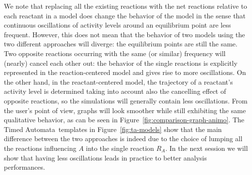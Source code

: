 \documentclass{llncs}
\newcommand{\tas}{Timed Automata}
\begin{document}
We note that replacing all the existing reactions with the net reactions relative to each
reactant in a model does change the behavior of the model in the sense that continuous oscillations
of activity levels around an equilibrium point are less frequent. However, this does not mean that the
behavior of two models using the two different approaches will diverge: the equilibrium points
are still the same.
Two opposite reactions occurring with the same (or similar) frequency will (nearly) cancel each other out: the
behavior of the single reactions is explicitly represented in the reaction-centered model and gives rise to more oscillations.
On the other hand, in the reactant-centered model, the trajectory of a reactant's activity level
is determined taking into account also the cancelling effect of opposite reactions, so the simulations
will generally contain less oscillations.
From the user's point of view, graphs will look smoother while still exhibiting the same qualitative behavior,
as can be seen in Figure~\ref{fig:comparison-graph-animo}.
The \tas\ templates in Figure~\ref{fig:ta-models} show that the main difference between the two approaches
is indeed due to the choice of lumping all the reactions influencing $A$ into the single
reaction $R_A$.
In the next session we will show that having less oscillations leads in practice to better analysis performances.
\end{document}
